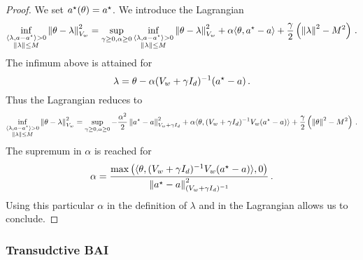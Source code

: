 \begin{proof}
We set $a^\star(\theta) = a^\star$. We introduce the Lagrangian
\[
 \inf_{\substack{\langle \lambda,a-a^\star \rangle>0\\ \left\lVert\lambda\right\rVert\leq M}} \left\lVert\theta -\lambda \right\rVert_{V_w}^2 = \sup_{\gamma\geq 0, \alpha\geq 0} \inf_{\substack{\langle \lambda,a-a^\star\rangle>0\\ \left\lVert\lambda\right\rVert\leq M}} \left\lVert\theta -\lambda \right\rVert_{V_w}^2 +\alpha \langle \theta, a^\star-a\rangle + \frac{\gamma}{2}\left(\left\lVert\lambda\right\rVert^2-M^2 \right)\,.
\]
The infimum above is attained for
\[
\lambda = \theta - \alpha (V_w + \gamma I_d)^{-1}(a^\star-a)\,.
\]
Thus the Lagrangian reduces to
\[
\inf_{\substack{\langle \lambda,a-a^\star \rangle>0\\ \left\lVert\lambda\right\rVert\leq M}} \left\lVert\theta -\lambda \right\rVert_{V_w}^2 = \sup_{\gamma\geq 0, \alpha\geq 0}
-\frac{\alpha^2}{2} \left\lVert a^\star-a\right\rVert^2_{V_w+\gamma I_d} + \alpha \langle \theta, (V_w+\gamma I_d)^{-1}V_w (a^\star-a)\rangle +\frac{\gamma}{2}\left(\left\lVert\theta\right\rVert^2-M^2 \right)\,.
\]
The supremum in $\alpha$ is reached for
\[
\alpha =\frac{\max\left(\langle \theta, (V_w+\gamma I_d)^{-1} V_w (a^\star-a)\rangle,0\right)}{\left\lVert a^\star-a\right\rVert^2_{(V_w+\gamma I_d)^{-1}}}\,.
\]
Using this particular $\alpha$ in the definition of $\lambda$ and in the Lagrangian allows us to conclude.
\end{proof}

\subsubsection{Transudctive BAI}


